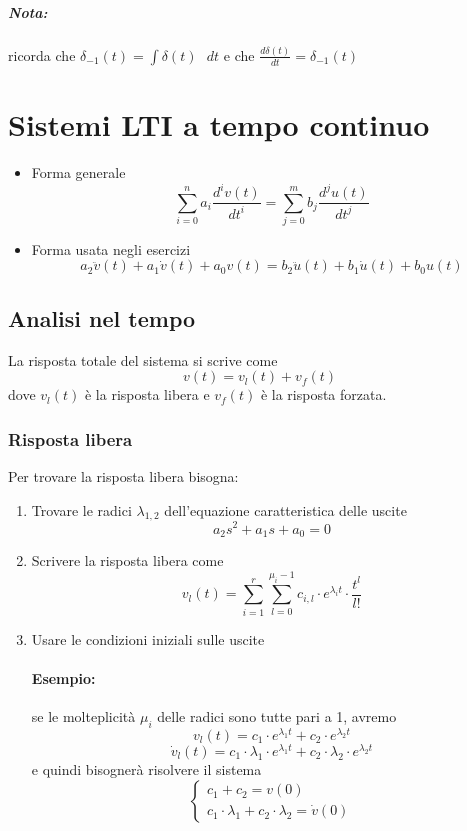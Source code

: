 \documentclass[a4paper]{article}
\begin{document}
	\subparagraph{Nota:}
	ricorda che $\delta_{-1} (t) = \int \delta(t) \text{ } dt$ e che $\frac{d \delta(t)}{dt} = \delta_{-1}(t)$
	
	
	\section{Sistemi LTI a tempo continuo}
	
	\begin{itemize}
		\item Forma generale
			\[ \sum_{i=0}^n a_i \frac{d^{i} v(t)}{dt^{i}} = \sum_{j=0}^m b_j \frac{d^{j} u(t)}{dt^{j}} \]
		\item Forma usata negli esercizi
			\[ a_2 \ddot{v}(t) + a_1 \dot{v}(t) + a_0 v(t) = b_2 \ddot{u}(t) + b_1 \dot{u}(t) + b_0 u(t) \]
	\end{itemize}
	
	\subsection{Analisi nel tempo}
	La risposta totale del sistema si scrive come
	\[ v(t) = v_l(t) + v_f(t) \]
	dove $v_l(t)$ è la risposta libera e $v_f(t)$ è la risposta forzata.

	\subsubsection{Risposta libera}
	Per trovare la risposta libera bisogna:
	
	\begin{enumerate}
		\item Trovare le radici $\lambda_{1,2}$ dell'equazione caratteristica delle uscite
			\[ a_2 s^2 + a_1 s + a_0 = 0 \]
		\item Scrivere la risposta libera come
			\[ v_l(t) = \sum_{i=1}^r \sum_{l=0}^{\mu_i-1} c_{i,l} \cdot e^{\lambda_it} \cdot \frac{t^l}{l!} \]
		\newpage
		\item Usare le condizioni iniziali sulle uscite
			\paragraph{Esempio:}
			se le molteplicità $\mu_i$ delle radici sono tutte pari a 1, avremo
			\[ v_l(t) = c_1 \cdot e^{\lambda_1t} + c_2 \cdot e^{\lambda_2t} \]
			\[ \dot{v}_l(t) = c_1 \cdot \lambda_1 \cdot e^{\lambda_1t} + c_2 \cdot \lambda_2 \cdot e^{\lambda_2t} \]
			e quindi bisognerà risolvere il sistema
			\[ \begin{cases}
				c_1 + c_2 = v(0) \\
				c_1 \cdot \lambda_1 + c_2 \cdot \lambda_2 = \dot{v}(0)
			\end{cases} \]
	\end{enumerate}
	
\end{document}
